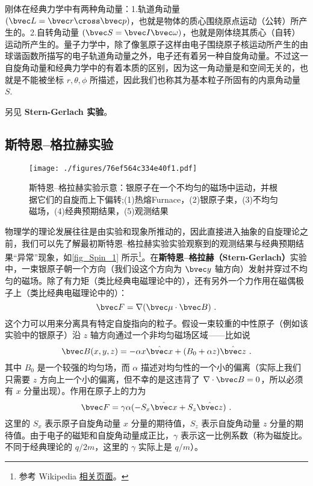 
\begin{issues}
\issueDraft
\end{issues}


刚体在经典力学中有两种角动量：1.轨道角动量 $(\bvec L = \bvec r\cross\bvec p)$，也就是物体的质心围绕原点运动（公转）所产生的。2.自转角动量 $(\bvec S = \bvec I\bvec\omega)$，也就是刚体绕其质心（自转）运动所产生的。量子力学中，除了像氢原子这样由电子围绕原子核运动所产生的由球谐函数所描写的电子轨道角动量之外，电子还有着另一种自旋角动量。不过这一自旋角动量和经典力学中的有着本质的区别，因为这一角动量是和空间无关的，也就是不能被坐标 $r,\theta,\phi$ 所描述，因此我们也称其为基本粒子所固有的内禀角动量 $S$. 

另见 \textbf{Stern-Gerlach 实验}。

\subsection{斯特恩–格拉赫实验}
\begin{figure}[ht]
\centering
\texttt{[image: ./figures/76ef564c334e40f1.pdf]}
\caption{斯特恩–格拉赫实验示意：银原子在一个不均匀的磁场中运动，并根据它们的自旋而上下偏转;(1)热熔Furnace，(2)银原子束，(3)不均匀磁场，(4)经典预期结果，(5)观测结果} \label{fig_Spin_1}
\end{figure}

物理学的理论发展往往是由实验和现象所推动的，因此直接进入抽象的自旋理论之前，我们可以先了解最初斯特恩–格拉赫实验实验观察到的观测结果与经典预期结果“异常”现象，如\autoref{fig_Spin_1} 所示\footnote{参考 Wikipedia \href{https://en.wikipedia.org/wiki/Stern\%E2\%80\%93Gerlach_experiment}{相关页面}。}。在\textbf{斯特恩–格拉赫（Stern-Gerlach）}实验中，一束银原子朝一个方向（我们设这个方向为 $\bvec y$ 轴方向）发射并穿过不均匀的磁场。除了有力矩（类比经典电磁理论中的），还有另外一个力作用在磁偶极子上（类比经典电磁理论中的）：
\begin{equation}\label{eq_Spin_1}
\bvec F=\nabla(\bvec \mu\cdot \bvec B)~.
\end{equation}
这个力可以用来分离具有特定自旋指向的粒子。假设一束较重的中性原子（例如该实验中的银原子）沿 $z$ 轴方向通过一个非均匀磁场区域——比如说
\begin{equation}\label{eq_Spin_2}
\bvec B(x,y,z)=-\alpha x \hat{\bvec x}+(B_0+\alpha z)\hat {\bvec z}~.
\end{equation}
其中 $B_0$ 是一个较强的均匀场，而 $\alpha$ 描述对均匀性的一个小的偏离（实际上我们只需要 $z$ 方向上一个小的偏离，但不幸的是这违背了 $\nabla\cdot \bvec B=0$，所以必须有 $x$ 分量出现）。作用在原子上的力为
\begin{equation}
\bvec F=\gamma \alpha (-S_x \hat{\bvec x}+S_z\hat{\bvec z})~.
\end{equation}
这里的 $S_x$ 表示原子自旋角动量 $x$ 分量的期待值，$S_z$ 表示自旋角动量 $z$ 分量的期待值。由于电子的磁矩和自旋角动量成正比，$\gamma$ 表示这一比例系数（称为磁旋比。不同于经典理论的 $q/2m$，这里的 $\gamma$ 实际上是 $q/m$）。


